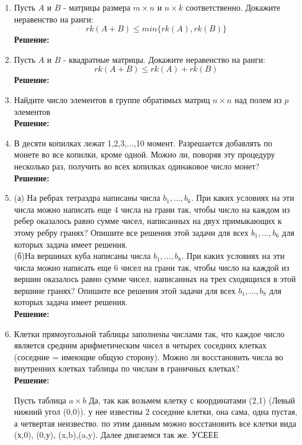 \documentclass[]{book}
\theoremstyle{definition}
\renewcommand{\leq}{\leqslant}
\begin{document}
\begin{enumerate}[resume]

\item Пусть $A$ и $B$ - матрицы размера $m\times n$ и $n\times k$ соответственно. Докажите неравенство на ранги:
$$rk(A+B)\leq min\{rk(A), rk(B)\}$$
\textbf{Решение:}


\item Пусть $A$ и $B$ - квадратные матрицы. Докажите неравенство на ранги:
$$rk(A+B)\leq rk(A)+rk(B)$$
\textbf{Решение:}


\item Найдите число элементов в группе обратимых матриц $n\times n$ над полем из $p$ элементов\\
\textbf{Решение:}


\item В десяти копилках лежат 1,2,3,...,10 момент. Разрешается добавлять по монете во все копилки, кроме одной. Можно ли, поворяя эту процедуру несколько раз, получить во всех копилках одинаковое число монет?\\
\textbf{Решение:}

\item (а) На ребрах тетраэдра написаны числа $b_1, ..., b_6$. При каких условиях на эти числа можно написать еще $4$ числа на грани так, чтобы число на каждом из ребер оказалось равно сумме чисел, написанных на двух примыкающих к этому ребру гранях? Опишите все решения этой задачи для всех $b_1, ..., b_6$ для которых задача имеет решения.\\
(б)На вершинах куба написаны числа $b_1, ..., b_8$. При каких условиях на эти числа можно написать еще $6$ чисел на грани так, чтобы число на каждой из вершин оказалось равно сумме чисел, написанных на трех сходящихся в этой вершине гранях? Опишите все решения этой задачи для всех $b_1, ..., b_8$ для которых задача имеет решения.\\
\textbf{Решение:}

\item Клетки прямоугольной таблицы заполнены числами так, что каждое число является средним арифметическим чисел в четырех соседних клетках (соседние = имеющие общую сторону). Можно ли восстановить числа во внутренних клетках таблицы по числам в граничных клетках?\\
\textbf{Решение:}

Пусть таблица $a\times b$ Да, так как возьмем клетку с координатами (2,1) (Левый нижний угол (0,0)). у нее известны 2 соседние клетки, она сама, одна пустая, а четвертая неизвество. по этим данным можно восстановить все клетки вида (х,0), (0,у), (x,b),(a,y). Далее двигаемся так же. УСЕЕЕ


\end{enumerate}
\end{document}
